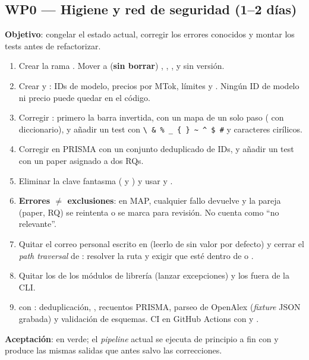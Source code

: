 \documentclass[11pt,a4paper]{article}
\newcommand{\WP}[1]{\textbf{\textcolor{palet}{WP#1}}}
\begin{document}
\subsection*{\WP{0} — Higiene y red de seguridad (1--2 días)}
\textbf{Objetivo}: congelar el estado actual, corregir los errores conocidos y montar los tests antes de refactorizar.
\begin{enumerate}
  \item Crear la rama . Mover a  (\textbf{sin borrar}) , , ,  y  sin versión.
  \item Crear  y : IDs de modelo, precios por MTok, límites y . Ningún ID de modelo ni precio puede quedar en el código.
  \item Corregir : primero la barra invertida, con un mapa de un solo paso ( con diccionario), y añadir un test con \verb|\ & % _ { } ~ ^ $ #| y caracteres cirílicos.
  \item Corregir  en PRISMA con un conjunto deduplicado de IDs, y añadir un test con un paper asignado a dos RQs.
  \item Eliminar la clave fantasma  ( y ) y usar  y .
  \item \textbf{Errores $\neq$ exclusiones}: en MAP, cualquier fallo devuelve  y la pareja (paper, RQ) se reintenta o se marca para revisión. No cuenta como ``no relevante''.
  \item Quitar el correo personal escrito en  (leerlo de  sin valor por defecto) y cerrar el \emph{path traversal} de : resolver la ruta y exigir que esté dentro de  o .
  \item Quitar los  de los módulos de librería (lanzar excepciones) y los  fuera de la CLI.
  \item {} con : deduplicación, , recuentos PRISMA, parseo de OpenAlex (\emph{fixture} JSON grabada) y validación de esquemas. CI en GitHub Actions con  y .
\end{enumerate}
\textbf{Aceptación}:  en verde; el \emph{pipeline} actual se ejecuta de principio a fin con  y produce las mismas salidas que antes salvo las correcciones.
\end{document}
